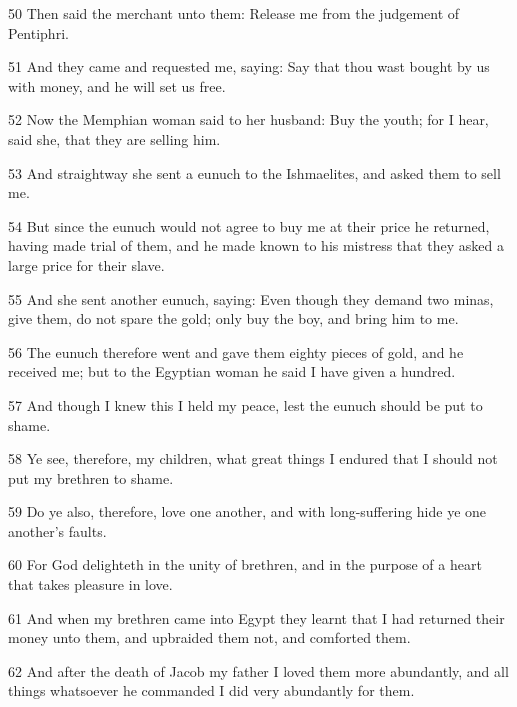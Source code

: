 \par 50 Then said the merchant unto them: Release me from the judgement of Pentiphri.

\par 51 And they came and requested me, saying: Say that thou wast bought by us with money, and he will set us free.

\par 52 Now the Memphian woman said to her husband: Buy the youth; for I hear, said she, that they are selling him.

\par 53 And straightway she sent a eunuch to the Ishmaelites, and asked them to sell me.

\par 54 But since the eunuch would not agree to buy me at their price he returned, having made trial of them, and he made known to his mistress that they asked a large price for their slave.

\par 55 And she sent another eunuch, saying: Even though they demand two minas, give them, do not spare the gold; only buy the boy, and bring him to me.

\par 56 The eunuch therefore went and gave them eighty pieces of gold, and he received me; but to the Egyptian woman he said I have given a hundred.

\par 57 And though I knew this I held my peace, lest the eunuch should be put to shame.

\par 58 Ye see, therefore, my children, what great things I endured that I should not put my brethren to shame.

\par 59 Do ye also, therefore, love one another, and with long-suffering hide ye one another's faults.

\par 60 For God delighteth in the unity of brethren, and in the purpose of a heart that takes pleasure in love.

\par 61 And when my brethren came into Egypt they learnt that I had returned their money unto them, and upbraided them not, and comforted them.

\par 62 And after the death of Jacob my father I loved them more abundantly, and all things whatsoever he commanded I did very abundantly for them.

